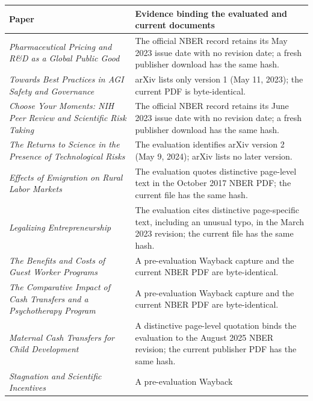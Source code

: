 \documentclass[
  11pt,
  letterpaper,
]{article}
\begin{document}
\begin{longtable}[]{@{}
  >{\raggedright\arraybackslash}p{}
  >{\raggedright\arraybackslash}p{}@{}}
\toprule\noalign{}
\begin{minipage}[b]{\linewidth}\raggedright
Paper
\end{minipage} & \begin{minipage}[b]{\linewidth}\raggedright
Evidence binding the evaluated and current documents
\end{minipage} \\
\midrule\noalign{}
\endhead
\bottomrule\noalign{}
\endlastfoot
\emph{Pharmaceutical Pricing and R\&D as a Global Public Good} & The
official NBER record retains its May 2023 issue date with no revision
date; a fresh publisher download has the same hash. \\
\emph{Towards Best Practices in AGI Safety and Governance} & arXiv lists
only version 1 (May 11, 2023); the current PDF is byte-identical. \\
\emph{Choose Your Moments: NIH Peer Review and Scientific Risk Taking} &
The official NBER record retains its June 2023 issue date with no
revision date; a fresh publisher download has the same hash. \\
\emph{The Returns to Science in the Presence of Technological Risks} &
The evaluation identifies arXiv version 2 (May 9, 2024); arXiv lists no
later version. \\
\emph{Effects of Emigration on Rural Labor Markets} & The evaluation
quotes distinctive page-level text in the October 2017 NBER PDF; the
current file has the same hash. \\
\emph{Legalizing Entrepreneurship} & The evaluation cites distinctive
page-specific text, including an unusual typo, in the March 2023
revision; the current file has the same hash. \\
\emph{The Benefits and Costs of Guest Worker Programs} & A
pre-evaluation Wayback capture and the current NBER PDF are
byte-identical. \\
\emph{The Comparative Impact of Cash Transfers and a Psychotherapy
Program} & A pre-evaluation Wayback capture and the current NBER PDF are
byte-identical. \\
\emph{Maternal Cash Transfers for Child Development} & A distinctive
page-level quotation binds the evaluation to the August 2025 NBER
revision; the current publisher PDF has the same hash. \\
\emph{Stagnation and Scientific Incentives} & A pre-evaluation Wayback

\end{longtable}
\end{document}
